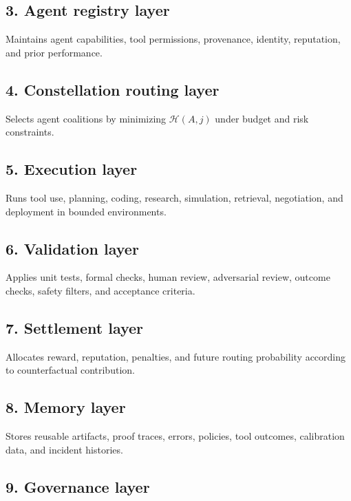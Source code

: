 \documentclass[11pt]{article}
\begin{document}
\subsection{3. Agent registry layer}\label{agent-registry-layer}

Maintains agent capabilities, tool permissions, provenance, identity,
reputation, and prior performance.

\subsection{4. Constellation routing
layer}\label{constellation-routing-layer}

Selects agent coalitions by minimizing \(\mathcal{H}(A,j)\) under budget
and risk constraints.

\subsection{5. Execution layer}\label{execution-layer}

Runs tool use, planning, coding, research, simulation, retrieval,
negotiation, and deployment in bounded environments.

\subsection{6. Validation layer}\label{validation-layer}

Applies unit tests, formal checks, human review, adversarial review,
outcome checks, safety filters, and acceptance criteria.

\subsection{7. Settlement layer}\label{settlement-layer}

Allocates reward, reputation, penalties, and future routing probability
according to counterfactual contribution.

\subsection{8. Memory layer}\label{memory-layer}

Stores reusable artifacts, proof traces, errors, policies, tool
outcomes, calibration data, and incident histories.

\subsection{9. Governance layer}\label{governance-layer}
\end{document}
